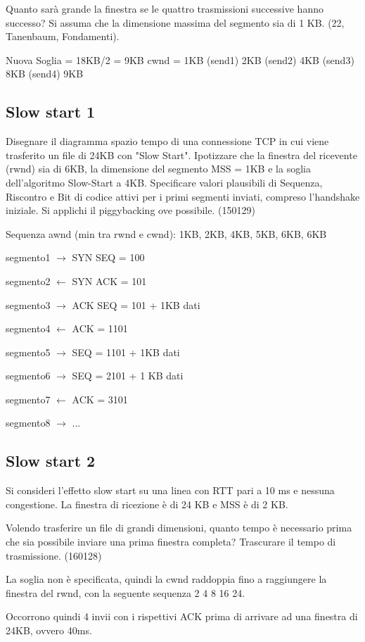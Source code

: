         Quanto sarà grande la finestra se le quattro trasmissioni successive hanno successo?
        Si assuma che la dimensione massima del segmento sia di 1 KB. (22, Tanenbaum, Fondamenti).

        \solution
        Nuova Soglia = 18KB/2 = 9KB
        cwnd = 1KB (send1) 2KB (send2) 4KB (send3) 8KB (send4) 9KB

    \subsection{Slow start 1}
        \problem
        Disegnare il diagramma spazio tempo di una connessione TCP in cui viene trasferito un file di 24KB con "Slow Start". Ipotizzare che la finestra del ricevente (rwnd) sia di 6KB, la dimensione del segmento MSS = 1KB e la soglia dell'algoritmo Slow-Start a 4KB. Specificare valori plausibili di Sequenza, Riscontro e Bit di codice attivi per i primi segmenti inviati, compreso l'hand\-shake iniziale. Si applichi il piggybacking ove possibile. (150129)

        \solution
        Sequenza awnd (min tra rwnd e cwnd): 1KB, 2KB, 4KB, 5KB, 6KB, 6KB

        segmento1 $\rightarrow$ SYN SEQ = 100

        segmento2 $\leftarrow$ SYN ACK = 101

        segmento3 $\rightarrow$ ACK SEQ = 101 + 1KB dati

        segmento4 $\leftarrow$ ACK = 1101

        segmento5 $\rightarrow$ SEQ = 1101 + 1KB dati

        segmento6 $\rightarrow$ SEQ = 2101 + 1 KB dati

        segmento7 $\leftarrow$ ACK = 3101

        segmento8 $\rightarrow$ ...

    \subsection{Slow start 2}
        \problem
        Si consideri l'effetto slow start su una linea con RTT pari a 10 ms e nessuna congestione. La finestra di ricezione è di 24 KB e MSS è di 2 KB.

        Volendo trasferire un file di grandi dimensioni, quanto tempo è necessario prima che sia possibile inviare una prima finestra completa? Trascurare il tempo di trasmissione. (160128)

        \solution
        La soglia non è specificata, quindi la cwnd raddoppia fino a raggiungere la finestra del rwnd, con la seguente sequenza 2 4 8 16 24.

        Occorrono quindi 4 invii con i rispettivi ACK prima di arrivare ad una finestra di 24KB, ovvero 40ms.